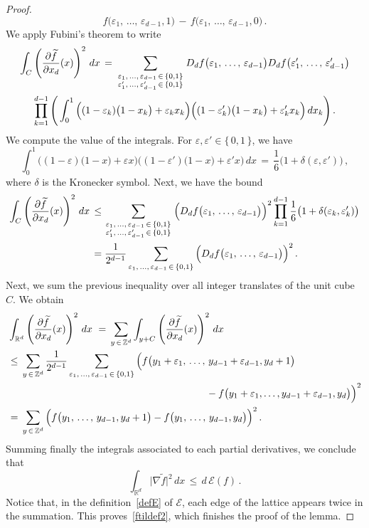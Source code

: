 \documentclass[AHL, Unicode, longabstracts, published]{cedram}
\newcommand{\tatop}[2]{\genfrac{}{}{0pt}{1}{#1}{#2}}
\newcommand*\Zd {{\mathbb Z^d}}
\newcommand*\Rd {{\mathbb R^d}}
\newcommand*\ft{\widetilde f}
\newcommand{\cE}{\mathcal{E}}
\begin{document}
\begin{proof}
\[f\big(\varepsilon_1,\,\dots,\,\varepsilon_{d-1},1\big)\,-\,
f\big(\varepsilon_1,\,\dots,\,\varepsilon_{d-1},0\big)\,.
\]
We apply Fubini's theorem to write
\begin{multline*}
\int_{C}
\left(\frac{\partial\ft}{\partial x_d}(x)\right)^2\,dx\,=\,
\sum_{\tatop{\varepsilon_1,\,\dots,\,\varepsilon_{d-1}\,\in\,\{0,1\}} {\varepsilon'_1,\,\dots,\,\varepsilon'_{d-1} \,\in\,\{0,1\}}} D_df\big(\varepsilon_1,\,\dots,\,\varepsilon_{d-1}\big) D_df\big(\varepsilon'_1,\,\dots,\,\varepsilon'_{d-1}\big)\\
\prod_{k=1}^{d-1}
\Bigg(\int_{0}^1
\Big((1-\varepsilon_k)\big(1-x_k\big) +\varepsilon_kx_k\Big)
\Big((1-\varepsilon'_k)\big(1-x_k\big) +\varepsilon'_kx_k\Big)\,dx_k\Bigg)
\,.
\end{multline*}
We compute the value of the integrals. For $\varepsilon,\varepsilon'\in\{\,0,1\,\}$, we have
\[
\int_{0}^1
\Big((1-\varepsilon)\big(1-x\big) +\varepsilon x\Big)
\Big((1-\varepsilon')\big(1-x\big) +\varepsilon'x\Big)\,dx\,=\,
\frac{1}{6}\big(1+\delta(
\varepsilon,\varepsilon')\big)\,,
\]
where $\delta$ is the Kronecker symbol. Next, we have the bound
\begin{align*}
\int_{C}
\left(\frac{\partial\ft}{\partial x_d}(x)\right)^2\,dx\,& \leq
\sum_{\tatop{\varepsilon_1,\,\dots,\,\varepsilon_{d-1}\,\in\,\{0,1\}} {\varepsilon'_1,\,\dots,\,\varepsilon'_{d-1} \,\in\,\{0,1\}}}
\Big(D_df\big(\varepsilon_1,\,\dots,\,\varepsilon_{d-1}\big)\Big)^2
\prod_{k=1}^{d-1}
\frac{1}{6}\big(1+\delta(
\varepsilon_k,\varepsilon'_k)
\big)\\
& =
\frac{1}{2^{d-1}}
\sum_{{\varepsilon_1,\,\dots,\,\varepsilon_{d-1}\,\in\,\{0,1\}}}
\Big(D_df\big(\varepsilon_1,\,\dots,\,\varepsilon_{d-1}\big)\Big)^2
\,.
\end{align*}
Next, we sum the previous inequality over all integer translates of the unit cube~$C$. We obtain
\begin{align*}
& \int_{\Rd}
\left(\frac{\partial\ft}{\partial x_d}(x)\right)^2\,dx\,
\,=\,\sum_{y\,\in\,\Zd}
\int_{y+C}
\left(\frac{\partial\ft}{\partial x_d}(x)\right)^2\,dx\,
\\
& \leq\,
\sum_{y\,\in\,\Zd}
\frac{1}{2^{d-1}}
\sum_{{\varepsilon_1,\,\dots,\,\varepsilon_{d-1}\,\in\,\{0,1\}}}
\Big(f\big(y_1+\varepsilon_1,\,\dots,\,y_{d-1}+\varepsilon_{d-1},y_d+1\big)
\\
&
\kern200pt -f\big(y_1+\varepsilon_1,\dots,y_{d-1}+\varepsilon_{d-1},y_d\big)
\Big)^2\\
& =\,
\sum_{y\,\in\,\Zd}
\Big(f\big(y_1,\,\dots,\,y_{d-1},y_d+1\big) -f\big(y_1,\,\dots,\,y_{d-1},y_d\big)
\Big)^2
\,.
\end{align*}
Summing finally the integrals associated to each partial derivatives, we conclude that
\[
\int_{\Rd}\big|\nabla \ft\big|^2\,dx\,\leq\,d\,\cE(f)\,.
\]
Notice that, in the definition~\eqref{defE} of $\cE$, each edge of the lattice appears twice in the summation. This proves~\eqref{ftildef2}, which finishes the proof of the lemma.
\end{proof}
\end{document}

